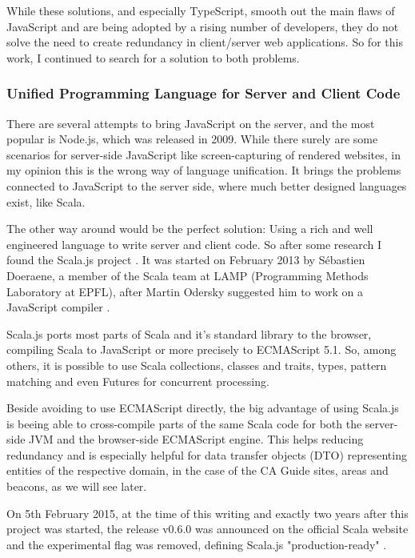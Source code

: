 While these solutions, and especially TypeScript, smooth out the main flaws of JavaScript and are being adopted by a rising number of developers, they do not solve the need to create redundancy in client/server web applications. So for this work, I continued to search for a solution to both problems.

\subsubsection{Unified Programming Language for Server and Client Code}

There are several attempts to bring JavaScript on the server, and the most popular is Node.js, which was released in 2009. While there surely are some scenarios for server-side JavaScript like screen-capturing of rendered websites, in my opinion this is the wrong way of language unification. It brings the problems connected to JavaScript to the server side, where much better designed languages exist, like Scala. 

The other way around would be the perfect solution: Using a rich and well engineered language to write server and client code. So after some research I found the Scala.js project \cite{scalajs}. It was started on February 2013 by Sébastien Doeraene, a member of the Scala team at LAMP (Programming Methods Laboratory at EPFL), after Martin Odersky suggested him to work on a JavaScript compiler \cite{scalajs-interview}.

Scala.js ports most parts of Scala and it's standard library to the browser, compiling Scala to JavaScript or more precisely to ECMAScript 5.1. So, among others, it is possible to use Scala collections, classes and traits, types, pattern matching and even Futures for concurrent processing. 


Beside avoiding to use ECMAScript directly, the big advantage of using Scala.js is beeing able to cross-compile parts of the same Scala code for both the server-side JVM and the browser-side ECMAScript engine. This helps reducing redundancy and is especially helpful for data transfer objects (DTO) representing entities of the respective domain, in the case of the CA Guide sites, areas and beacons, as we will see later.

On 5th February 2015, at the time of this writing and exactly two years after this project was started, the release v0.6.0 was announced on the official Scala website and the experimental flag was removed, defining Scala.js "production-ready" \cite{scalajs06}.

